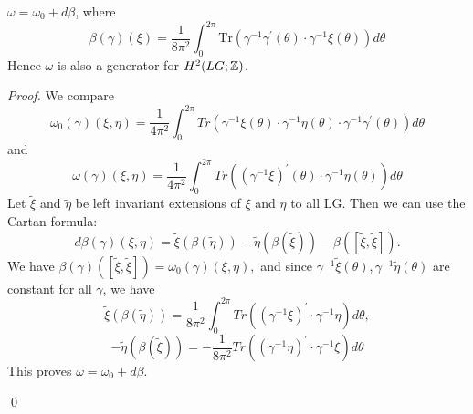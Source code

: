 \begin{lemma}
 $\omega = \omega_{0} + d \beta$, where 
\begin{equation*}
 \beta(\gamma)(\xi) = \dfrac{1}{8 \pi^{2}} \int_{0}^{2\pi} \mathrm{Tr}(\gamma^{-1}\gamma^{'}(\theta)
 \cdot \gamma^{-1}\xi(\theta))d\theta
\end{equation*}
Hence $\omega$ is also a generator for $H^{2}(LG; \mathbb{Z})$.
\begin{proof}
 We compare 
 \begin{equation}\label{6}
  \omega_{0}(\gamma)(\xi,\eta) =  \dfrac{1}{4\pi^{2}}\int_{0}^{2\pi} Tr(\gamma^{-1}\xi(\theta)\cdot \gamma^{-1}\eta(\theta)\cdot \gamma^{-1}\gamma^{'}(\theta))d\theta
 \end{equation}
 and 
 \begin{equation}\label{7}
  \omega(\gamma)(\xi,\eta) =  \dfrac{1}{4\pi^{2}}\int_{0}^{2\pi} Tr((\gamma^{-1}\xi)^{'}(\theta)\cdot  \gamma^{-1}\eta(\theta))d\theta
 \end{equation}
Let $\tilde{\xi}$ and $\tilde{\eta}$ be left invariant extensions of $\xi$ and $\eta$ to all LG. Then we can use the
Cartan formula:
\begin{equation*}
 d\beta(\gamma)(\xi,\eta) = \tilde{\xi}(\beta(\tilde{\eta})) - \tilde{\eta}(\beta(\tilde{\xi})) - \beta([\tilde{\xi},
 \tilde{\xi}]).
\end{equation*}
We have $\beta(\gamma)([\tilde{\xi},
 \tilde{\xi}])= \omega_{0}(\gamma)(\xi,\eta),$ and since $\gamma^{-1}\tilde{\xi}(\theta), \gamma^{-1}\tilde{\eta}(\theta)$
 are constant for all $\gamma$, we have 
 \begin{equation*}
  \tilde{\xi}(\beta(\tilde{\eta})) = \dfrac{1}{8\pi^{2}}\int_{0}^{2\pi} Tr((\gamma^{-1}\xi)^{'}\cdot \gamma^{-1} \eta)d\theta,
 \end{equation*}
\begin{equation*}
 -\tilde{\eta}(\beta(\tilde{\xi})) = -\dfrac{1}{8\pi^{2}} Tr((\gamma^{-1}\eta)^{'}\cdot \gamma^{-1} \xi)d\theta
\end{equation*}
This proves $\omega = \omega_{0} +d\beta$.



 \qed
\end{proof}


\end{lemma}
